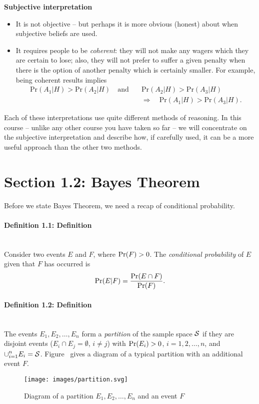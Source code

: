 \textbf{Subjective interpretation}
\begin{itemize}
\item It is not objective -- but perhaps it is more obvious (honest) about when
subjective beliefs are used.
\item It requires people to be {\it coherent}: they will not make any
wagers which they are certain to lose; also, they will not prefer to
suffer a given penalty when there is the option of another penalty
which is certainly smaller. For example, being coherent results implies
\begin{align*}
\text{Pr}(A_1|H)>\text{Pr}(A_2|H)\quad\text{and}\quad &\text{Pr}(A_2|H)>\text{Pr}(A_3|H) \\
&\Longrightarrow\quad \text{Pr}(A_1|H)>\text{Pr}(A_3|H).
\end{align*}
\end{itemize}

Each of these interpretations use quite different methods of
reasoning. In this course -- unlike any other course you have taken so far -- we will concentrate on the subjective interpretation and
describe how, if carefully used, it can be a more useful approach than
the other two methods.

\section{Section 1.2: Bayes Theorem}
Before we state Bayes Theorem, we need a recap of conditional
probability.

\paragraph{Definition 1.1: Definition}{~\\
Consider two events $E$ and $F$, where $\textnormal{Pr}(F)>0$. The
\textit{conditional probability} of $E$ given that $F$ has occurred is
$$
\textnormal{Pr}(E|F)=\frac{\textnormal{Pr}(E\cap F)}{\textnormal{Pr}(F)}.
$$}

\paragraph{Definition 1.2: Definition}{~\\
The events $E_1,E_2,\ldots,E_n$ form a {\it partition} of the sample
space ${\cal S}$ if they are disjoint events ($E_i\cap E_j=\emptyset$,
$i\neq j$) with $\textnormal{Pr}(E_i)>0$, $i=1,2,\ldots,n$, and
$\displaystyle{\cup_{i=1}^n E_i}={\cal S}$.
Figure~ gives a diagram of a typical partition with
an additional event $F$.

\begin{figure}[ht]

\texttt{[image: images/partition.svg]}
\caption{Diagram of a partition $E_1,E_2,\ldots,E_n$ and an event $F$}
\label{fig:partition}

\end{figure}}
\clearpage

